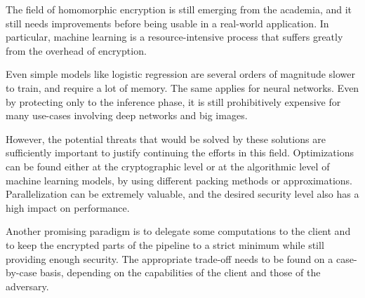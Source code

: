 \documentclass[a4paper,11pt,oneside]{report}
\begin{document}

The field of homomorphic encryption is still emerging from the academia, and it still needs improvements before being usable in a real-world application. 
In particular, machine learning is a resource-intensive process that suffers greatly from the overhead of encryption.

Even simple models like logistic regression are several orders of magnitude slower to train, and require a lot of memory. 
The same applies for neural networks. Even by protecting only to the inference phase, it is still prohibitively expensive for many use-cases involving deep networks and big images.

However, the potential threats that would be solved by these solutions are sufficiently important to justify continuing the efforts in this field.
Optimizations can be found either at the cryptographic level or at the algorithmic level of machine learning models, by using different packing methods or approximations.
Parallelization can be extremely valuable, and the desired security level also has a high impact on performance.

Another promising paradigm is to delegate some computations to the client and to keep the encrypted parts of the pipeline to a strict minimum while still providing enough security. 
The appropriate trade-off needs to be found on a case-by-case basis, depending on the capabilities of the client and those of the adversary.


\cleardoublepage
{}
{}
\printbibliography
\end{document}
